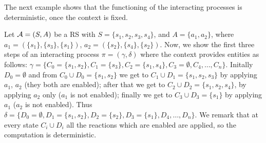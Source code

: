 The next example shows that the functioning of the interacting processes is deterministic, once the context is fixed.

\begin{example}
Let  ${\cal A}=(S,A)$ be a RS with  $S=\{s_1,s_2,s_3,s_4\}$, and  $A = \{ a_1,a_2\}$, where $a_1 = (\{s_1\},\{s_3\},\{s_1\})$,  $a_2 = (\{s_2\},\{s_4\},\{s_2\})$. 
 Now, we show the first three steps of an interacting process $\pi=(\gamma,\delta)$ where the context provides entities as follows: $\gamma = \{C_0 = \{s_1,s_2\}, C_1 =\{s_3\},C_2=\{s_1,s_4\},C_3= \emptyset, C_4,\dots, C_n\}$. Initally $D_0 = \emptyset$ and from
 $C_0\cup D_0=\{s_1,s_2\}$ we get to $C_1\cup D_1=\{s_1,s_2,s_3\}$ by applying  $a_1$, $a_2$ (they both are enabled); after that  we get to $C_2\cup D_2=\{s_1,s_2,s_4\}$, by applying $a_2$ only ($a_1$ is not enabled); finally we get to $C_3\cup D_3=\{s_1\}$ by applying $a_1$ ($a_2$ is not enabled). 
Thus $\delta=\{D_0 = \emptyset, D_1=\{s_1,s_2\},D_2=\{s_2\},D_3=\{s_1\},D_4,\dots,D_n\}$.
We remark that at every state $C_i \cup D_i$ all the reactions which are enabled are applied, so the computation is deterministic.
\end{example}



